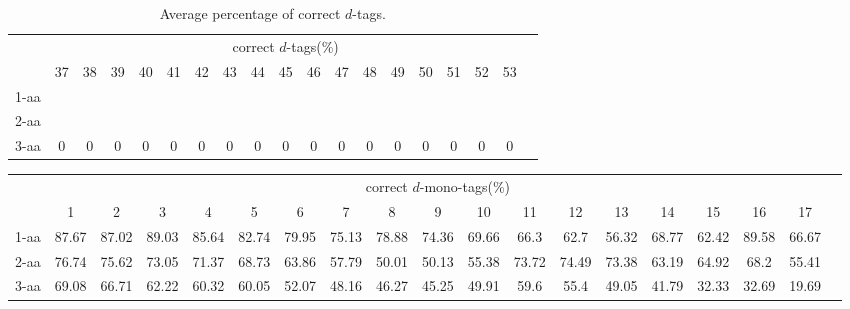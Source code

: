 \begin{table}[h]\tiny
\vspace{3mm}
{\centering
\begin{center}
\begin{tabular}{|l|c|c|c|c|c|c|c|c|c|c|c|c|c|c|c|c|c|c|}
  \hline
  & \multicolumn{ 17 }{|c|}{correct $d$-tags(\%)} \\
  \cline{2- 18}
    & 37 & 38 & 39 & 40 & 41 & 42 & 43 & 44 & 45 & 46 & 47 & 48 & 49 & 50 & 51 & 52 & 53\\
  \hline
1-aa  &  &  &  &  &  &  &  &  &  &  &  &  &  &  &  &  & \\
2-aa  &  &  &  &  &  &  &  &  &  &  &  &  &  &  &  &  & \\
3-aa  & 0 & 0 & 0 & 0 & 0 & 0 & 0 & 0 & 0 & 0 & 0 & 0 & 0 & 0 & 0 & 0 & 0\\
 \hline
\end{tabular}
\end{center}
\par}
\centering

\caption{ Average percentage of correct $d$-tags.}

\vspace{3mm}
\label{table:correct-d-tags}
\end{table}
\begin{table}[h]\tiny
\vspace{3mm}
{\centering
\begin{center}
\begin{tabular}{|l|c|c|c|c|c|c|c|c|c|c|c|c|c|c|c|c|c|c|}
  \hline
  & \multicolumn{ 17 }{|c|}{correct $d$-mono-tags(\%)} \\
  \cline{2- 18}
    & 1 & 2 & 3 & 4 & 5 & 6 & 7 & 8 & 9 & 10 & 11 & 12 & 13 & 14 & 15 & 16 & 17\\
  \hline
1-aa  & 87.67 & 87.02 & 89.03 & 85.64 & 82.74 & 79.95 & 75.13 & 78.88 & 74.36 & 69.66 & 66.3 & 62.7 & 56.32 & 68.77 & 62.42 & 89.58 & 66.67\\
2-aa  & 76.74 & 75.62 & 73.05 & 71.37 & 68.73 & 63.86 & 57.79 & 50.01 & 50.13 & 55.38 & 73.72 & 74.49 & 73.38 & 63.19 & 64.92 & 68.2 & 55.41\\
3-aa  & 69.08 & 66.71 & 62.22 & 60.32 & 60.05 & 52.07 & 48.16 & 46.27 & 45.25 & 49.91 & 59.6 & 55.4 & 49.05 & 41.79 & 32.33 & 32.69 & 19.69\\
 \hline
\end{tabular}
\end{center}
\par}
\centering

\vspace{3mm}
\label{table:correct-d-mono-tags}
\end{table}
